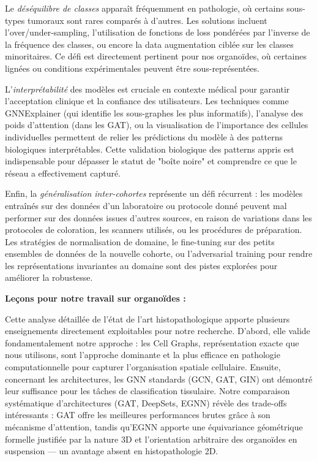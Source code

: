 Le \textit{déséquilibre de classes} apparaît fréquemment en pathologie, où certains sous-types tumoraux sont rares comparés à d'autres. Les solutions incluent l'over/under-sampling, l'utilisation de fonctions de loss pondérées par l'inverse de la fréquence des classes, ou encore la data augmentation ciblée sur les classes minoritaires. Ce défi est directement pertinent pour nos organoïdes, où certaines lignées ou conditions expérimentales peuvent être sous-représentées.

L'\textit{interprétabilité} des modèles est cruciale en contexte médical pour garantir l'acceptation clinique et la confiance des utilisateurs. Les techniques comme GNNExplainer (qui identifie les sous-graphes les plus informatifs), l'analyse des poids d'attention (dans les GAT), ou la visualisation de l'importance des cellules individuelles permettent de relier les prédictions du modèle à des patterns biologiques interprétables. Cette validation biologique des patterns appris est indispensable pour dépasser le statut de "boîte noire" et comprendre ce que le réseau a effectivement capturé.

Enfin, la \textit{généralisation inter-cohortes} représente un défi récurrent : les modèles entraînés sur des données d'un laboratoire ou protocole donné peuvent mal performer sur des données issues d'autres sources, en raison de variations dans les protocoles de coloration, les scanners utilisés, ou les procédures de préparation. Les stratégies de normalisation de domaine, le fine-tuning sur des petits ensembles de données de la nouvelle cohorte, ou l'adversarial training pour rendre les représentations invariantes au domaine sont des pistes explorées pour améliorer la robustesse.

\textbf{Leçons pour notre travail sur organoïdes :}

Cette analyse détaillée de l'état de l'art histopathologique apporte plusieurs enseignements directement exploitables pour notre recherche. D'abord, elle valide fondamentalement notre approche : les Cell Graphs, représentation exacte que nous utilisons, sont l'approche dominante et la plus efficace en pathologie computationnelle pour capturer l'organisation spatiale cellulaire. Ensuite, concernant les architectures, les GNN standards (GCN, GAT, GIN) ont démontré leur suffisance pour les tâches de classification tissulaire. Notre comparaison systématique d'architectures (GAT, DeepSets, EGNN) révèle des trade-offs intéressants : GAT offre les meilleures performances brutes grâce à son mécanisme d'attention, tandis qu'EGNN apporte une équivariance géométrique formelle justifiée par la nature 3D et l'orientation arbitraire des organoïdes en suspension — un avantage absent en histopathologie 2D.

